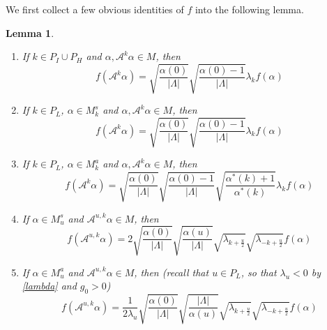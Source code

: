 \documentclass[11pt]{article}
\numberwithin{equation}{section}
\newcommand{\beq}{\begin{equation}}
\newcommand{\eeq}{\end{equation}}
\newcommand\al{{\alpha}}
\newtheorem{lem}{Lemma}[section]
\theoremstyle{definition}
\begin{document}
We first collect a few obvious identities of $f$ into the following lemma. 

\begin{lem} \label{f}
\begin{enumerate}
	\item  If $k\in P_I\cup P_H$ and $\al, \mathcal A^k \al  \in M$, then 
	\beq \label{properf1}f( \mathcal A^k \al )=\sqrt{\frac{\al(0)}{|\Lambda|}}\sqrt{\frac{\al(0)-1}{|\Lambda|}}\lambda_k f(\al)
	\eeq
	\item If $k\in P_L$, $\al\in M_k^s$ and $\al, \mathcal A^k \al  \in M$, then 
	\beq \label{properf2}f( \mathcal A^k \al )=\sqrt{\frac{\al(0)}{|\Lambda|}}\sqrt{\frac{\al(0)-1}{|\Lambda|}}\lambda_k f(\al)
	\eeq
  \item If $k\in P_L$, $\al\in M^a_k$ and $\al, \mathcal A^k \al  \in M$, then
 	\beq \label{properf3}f( \mathcal A^k\al )=\sqrt{\frac{\al(0)}{|\Lambda|}}\sqrt{\frac{\al(0)-1}{|\Lambda|}}\sqrt{\frac{\al^*(k)+1}{\al^*(k)}}\lambda_k f(\al)
	\eeq
	\item If $\al\in M_u^s$ and $ \mathcal A^{u, k}\al  \in M$, then 
	\beq\label{properf4}
f( \mathcal A^{u, k}\al )=2\sqrt{\frac{\al(0)}{|\Lambda|}}\sqrt{\frac{\al(u)}{|\Lambda|}}\sqrt{\lambda_{k+\frac{u}{2}}}\sqrt{\lambda_{-k+\frac{u}{2}}}f(\al)
	\eeq
	\item If $\al\in M_u^a$ and $ \mathcal A^{u, k}\al  \in M$, then (recall that $u\in P_L$, so that $\lambda_u<0$ by \eqref{lambda} and $g_0>0$)
	\beq\label{properf5}
f( \mathcal A^{u, k}\al )=\frac{1}{2\lambda_u}\sqrt{\frac{\al(0)}{|\Lambda|}}\sqrt{\frac{|\Lambda|}{\al(u)}}\sqrt{\lambda_{k+\frac{u}{2}}}\sqrt{\lambda_{-k+\frac{u}{2}}}f(\al)
	\eeq
\end{enumerate}
\end{lem}
\end{document}
